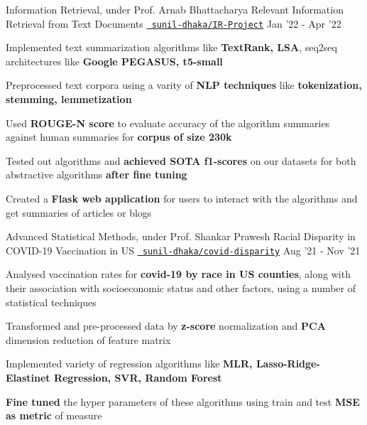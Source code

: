 
\begin{cventries}
  \cventry
  {Information Retrieval, under Prof. Arnab Bhattacharya}
  {Relevant Information Retrieval from Text Documents}
  {\texttt{\href{https://github.com/sunil-dhaka/IR-Project}{\faGithub{} sunil-dhaka/IR-Project}}}
  {Jan '22 - Apr '22}
  {
    \begin{cvitems}
    \item Implemented text summarization algorithms like \textbf{TextRank, LSA}, seq2seq architectures like \textbf{Google PEGASUS, t5-small}
    \item Preprocessed text corpora using a varity of \textbf{NLP techniques} like \textbf{tokenization, stemming, lemmetization}
    \item Used \textbf{ROUGE-N score} to evaluate accuracy of the algorithm summaries against human summaries for \textbf{corpus of size 230k}
    \item Tested out algorithms and \textbf{achieved SOTA f1-scores} on our datasets for both abstractive algorithms \textbf{after fine tuning}
    \item Created a \textbf{Flask web application} for users to interact with the algorithms and get summaries of articles or blogs%
    \end{cvitems}
  }

  \cventry
  {Advanced Statistical Methods, under Prof. Shankar Prawesh}
  {Racial Disparity in COVID-19 Vaccination in US}
  {\texttt{\href{https://github.com/sunil-dhaka/ime692-project}{\faGithub{} sunil-dhaka/covid-disparity}}}
  {Aug '21 - Nov '21}
  {
    \begin{cvitems}
    \item Analysed vaccination rates for \textbf{covid-19 by race in US counties}, along with their association with socioeconomic status and other factors, using a number of statistical techniques
    \item Transformed and pre-processed data by \textbf{z-score} normalization and \textbf{PCA} dimension reduction of feature matrix
    \item Implemented variety of regression algorithms like \textbf{MLR, Lasso-Ridge-Elastinet Regression, SVR, Random Forest}
    \item \textbf{Fine tuned} the hyper parameters of these algorithms using train and test \textbf{MSE as metric} of measure
    \end{cvitems}
  }


\end{cventries}
